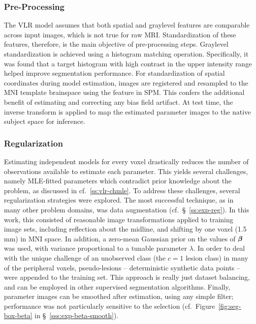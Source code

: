 \subsubsection{Pre-Processing}
The VLR model assumes that both spatial and graylevel features are comparable across input images,
which is not true for raw MRI.
Standardization of these features, therefore, is the main objective of pre-processing steps.
Graylevel standardization is achieved using a histogram matching operation.
Specifically, it was found that a target histogram with high contrast in the upper intensity range
helped improve segmentation performance.
For standardization of spatial coordinates during model estimation,
images are registered and resampled to the MNI template brainspace
using the  feature in SPM.
This confers the additional benefit of estimating and correcting any bias field artifact.
At test time, the inverse transform is applied to map the estimated parameter images
to the native subject space for inference.
\subsubsection{Regularization}
Estimating independent models for every voxel drastically reduces the number of observations
available to estimate each parameter.
This yields several challenges, namely MLE-fitted parameters which
contradict prior knowledge about the problem, as discussed in cf.~\ref{ss:vlr-chmle}.
To address these challenges, several regularization strategies were explored.
The most successful technique, as in many other problem domains, was data augmentation
(cf.~\S~\ref{ss:exp-reg}).
In this work, this consisted of reasonable image transformations
applied to training image sets, including
reflection about the midline,
and shifting by one voxel (1.5 mm) in MNI space.
In addition, a zero-mean Gaussian prior on the values of $\bm{\beta}$ was used,
with variance proportional to a tunable parameter $\lambda$.
In order to deal with the unique challenge of an unobserved class (the $c=1$ lesion class)
in many of the peripheral voxels,
pseudo-lesions -- deterministic synthetic data points --
were appended to the training set.
This approach is really just dataset balancing,
and can be employed in other supervised segmentation algorithms.
Finally, parameter images can be smoothed after estimation, using any simple filter;
performance was not particularly sensitive to the selection
(cf.~Figure~\ref{fig:seg-box-beta} in \S~\ref{sss:exp-beta-smooth}).
